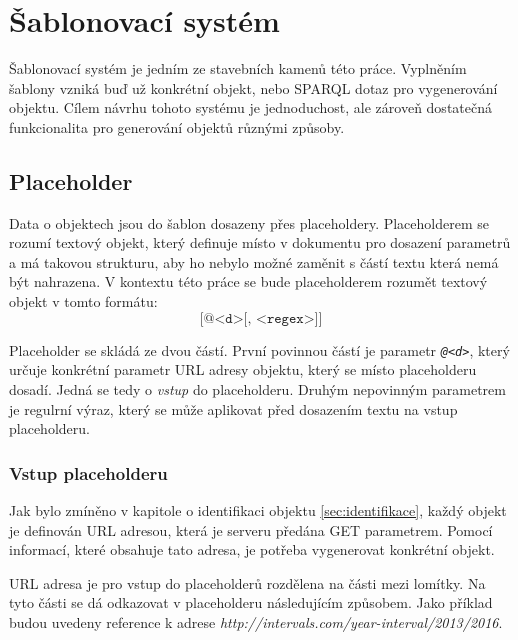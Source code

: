 \documentclass[thesis=B,czech]{FITthesis}[2012/06/26]
\begin{document}
 \section{Šablonovací systém}\label{template_system}
 Šablonovací systém je jedním ze stavebních kamenů této práce. Vyplněním šablony vzniká buď už konkrétní objekt, nebo SPARQL dotaz pro vygenerování objektu.
 Cílem návrhu tohoto systému je jednoduchost, ale zároveň dostatečná funkcionalita pro generování objektů různými způsoby.
 
 \subsection{Placeholder}
 Data o objektech jsou do šablon dosazeny přes placeholdery. Placeholderem se rozumí textový objekt, který definuje místo v dokumentu pro dosazení parametrů
 a má takovou strukturu, aby ho nebylo možné zaměnit s částí textu která nemá být nahrazena. V kontextu této práce se bude placeholderem rozumět textový objekt
 v tomto formátu:
 \begin{equation} \label{eq:placeholder}
 \texttt{[@<d>[, <regex>]]}
 \end{equation}
 
 Placeholder se skládá ze dvou částí. První povinnou částí je parametr \textit{\texttt{@<d>}}, který určuje konkrétní parametr URL adresy objektu,
 který se místo placeholderu dosadí. Jedná se tedy o \textit{vstup} do placeholderu.
 Druhým nepovinným parametrem je regulrní výraz, který se může aplikovat před dosazením textu na vstup placeholderu.
 
 \subsubsection{Vstup placeholderu}
 Jak bylo zmíněno v kapitole o identifikaci objektu \ref{sec:identifikace}, každý objekt je definován URL adresou, která je serveru předána GET parametrem.
 Pomocí informací, které obsahuje tato adresa, je potřeba vygenerovat konkrétní objekt.
 
 URL adresa je pro vstup do placeholderů rozdělena na části mezi lomítky. Na tyto části se dá odkazovat v placeholderu následujícím způsobem. Jako příklad 
 budou uvedeny reference k adrese \textit{http://intervals.com/year-interval/2013/2016}.
  
\end{document}

